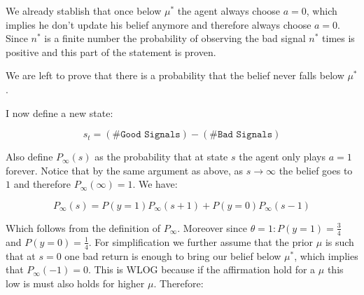 \documentclass{article}
\begin{document}
We already stablish that once below $\mu^*$ the agent always choose $a = 0$, which implies
he don't update his belief anymore and therefore always choose $a = 0$. Since $n^*$ is a
finite number the probability of observing the bad signal $n^*$ times is positive and this
part of the statement is proven.

We are left to prove that there is a probability that the belief never falls below $\mu^*$.






I now define a new state:

\[
  s_t = (\texttt{\# Good Signals}) - (\texttt{\# Bad Signals})
\]


\newcommand{\Pn}{P_{\infty}}
Also define $\Pn(s)$ as the probability that at state $s$ the agent
only plays $a = 1$ forever. Notice that by the same argument as above, as
$s \to \infty$ the belief goes to $1$ and therefore $\Pn(\infty) = 1$.
We have:

\[
  \Pn(s) = P(y=1)\Pn(s+1) + P(y=0)\Pn(s-1)
\]

Which follows from the definition of $\Pn$. Moreover since $\theta = 1:
P(y=1) = \frac{3}{4}$ and $P(y=0) = \frac{1}{4}$. For simplification we
further assume that the prior $\mu$ is such that at $s = 0$ one bad return
is enough to bring our belief below $\mu^*$, which implies that $\Pn(-1) = 0$.
This is WLOG because if the affirmation hold for a $\mu$ this low is must also
holds for higher $\mu$.  Therefore:
\end{document}
